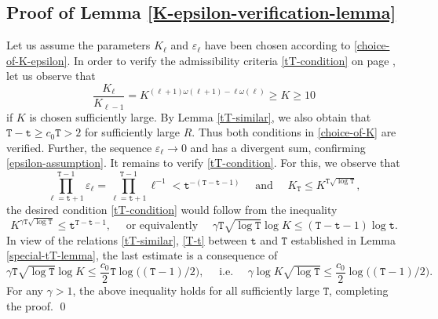 \documentclass[12pt, twoside]{article}
\theoremstyle{definition}
\numberwithin{equation}{section}
\begin{document}
\subsection{Proof of Lemma \ref{K-epsilon-verification-lemma}}
Let us assume the parameters $K_{\ell}$ and $\varepsilon_{\ell}$ have been chosen according to \eqref{choice-of-K-epsilon}. In order to verify the admissibility criteria \eqref{tT-condition} on page \pageref{tT-condition}, let us observe that 
\[ \frac{K_{\ell}}{K_{\ell-1}} = K^{(\ell + 1) \omega(\ell+1) - \ell \omega(\ell)} \geq K \geq 10 \] 
if $K$ is chosen sufficiently large. By Lemma \ref{tT-similar}, we also obtain that $\mathtt T - \mathtt t \geq c_0 \mathtt T > 2$ for sufficiently large $R$. Thus both conditions in \eqref{choice-of-K} are verified. Further, the sequence $\varepsilon_{\ell} \rightarrow 0$ and has a divergent sum, confirming \eqref{epsilon-assumption}.  
\vskip0.1in
\noindent It remains to verify \eqref{tT-condition}. For this, we observe that   
\[ \prod_{\ell=\mathtt t+1}^{\mathtt T-1 } \varepsilon_{\ell} = \prod_{\ell=\mathtt t+1}^{\mathtt T-1 } \ell^{-1} < \mathtt t^{-(\mathtt T- \mathtt t - 1 )} \quad \text{ and } \quad K_{\mathtt T} \leq K^{\mathtt T \sqrt{\log \mathtt T}}, \]
the desired condition \eqref{tT-condition} would follow from the inequality 
\begin{equation} 
K^{\gamma \mathtt T \sqrt{\log \mathtt T}} \leq \mathtt t^{\mathtt T - \mathtt t - 1}, \quad \text{ or equivalently } \quad \gamma \mathtt T \sqrt{\log \mathtt T} \log K \leq (\mathtt T - \mathtt t - 1) \log \mathtt t. 
\end{equation}    
In view of the relations \eqref{tT-similar}, \eqref{T-t} between $\mathtt t$ and $\mathtt T$ established in Lemma \ref{special-tT-lemma}, the last estimate is a consequence  of
\[\gamma \mathtt T \sqrt{\log \mathtt T} \log K \leq \frac{c_0}{2}  \mathtt T \log \bigl((\mathtt T-1)/{2} \bigr), \quad \text{ i.e. } \quad \gamma \log K \sqrt{\log \mathtt T} \leq \frac{c_0}{2} \log \bigl((\mathtt T-1)/{2} \bigr). \]
For any $\gamma > 1$, the above inequality holds for all sufficiently large $\mathtt T$, completing the proof.  
\qed
\end{document}
